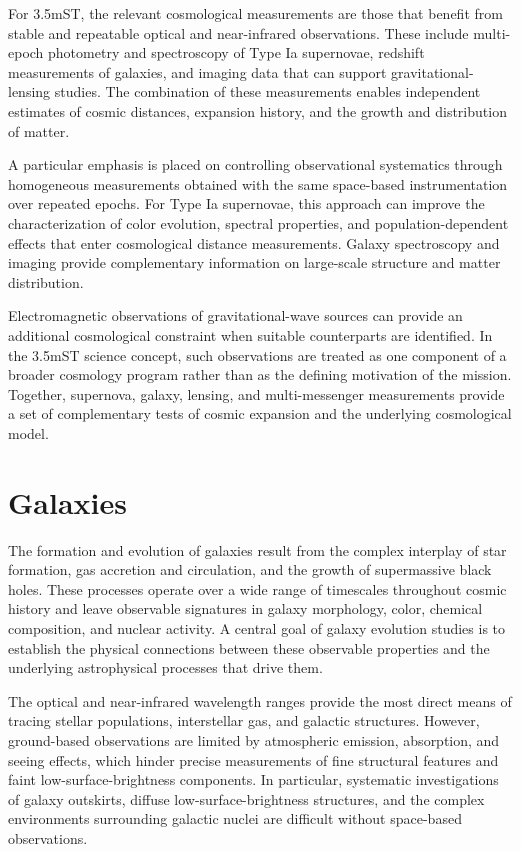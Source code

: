 For 3.5mST, the relevant cosmological measurements are those that benefit
from stable and repeatable optical and near-infrared observations. These
include multi-epoch photometry and spectroscopy of Type Ia supernovae,
redshift measurements of galaxies, and imaging data that can support
gravitational-lensing studies. The combination of these measurements enables
independent estimates of cosmic distances, expansion history, and the growth
and distribution of matter.

A particular emphasis is placed on controlling observational systematics
through homogeneous measurements obtained with the same space-based
instrumentation over repeated epochs. For Type Ia supernovae, this approach
can improve the characterization of color evolution, spectral properties,
and population-dependent effects that enter cosmological distance
measurements. Galaxy spectroscopy and imaging provide complementary
information on large-scale structure and matter distribution.

Electromagnetic observations of gravitational-wave sources can provide an
additional cosmological constraint when suitable counterparts are identified.
In the 3.5mST science concept, such observations are treated as one component
of a broader cosmology program rather than as the defining motivation of the
mission. Together, supernova, galaxy, lensing, and multi-messenger
measurements provide a set of complementary tests of cosmic expansion and
the underlying cosmological model.


\section{Galaxies}

The formation and evolution of galaxies result from the complex interplay of star formation, gas accretion and circulation, and the growth of supermassive black holes. These processes operate over a wide range of timescales throughout cosmic history and leave observable signatures in galaxy morphology, color, chemical composition, and nuclear activity. A central goal of galaxy evolution studies is to establish the physical connections between these observable properties and the underlying astrophysical processes that drive them.

The optical and near-infrared wavelength ranges provide the most direct means of tracing stellar populations, interstellar gas, and galactic structures. However, ground-based observations are limited by atmospheric emission, absorption, and seeing effects, which hinder precise measurements of fine structural features and faint low-surface-brightness components. In particular, systematic investigations of galaxy outskirts, diffuse low-surface-brightness structures, and the complex environments surrounding galactic nuclei are difficult without space-based observations.

